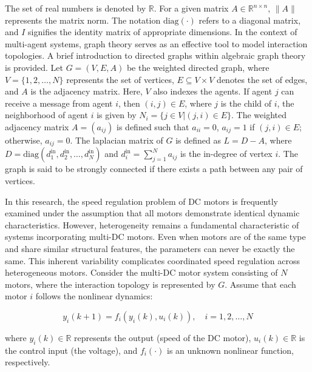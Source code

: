 \documentclass[journal,onecolumn]{IEEEtran}
\begin{document}
The set of real numbers is denoted by $\mathbb{R}$. For a given matrix $A \in \mathbb{R}^{n \times n}$, $\|A\|$ represents the matrix norm. The notation $\text{diag}(\cdot)$ refers to a diagonal matrix, and $I$ signifies the identity matrix of appropriate dimensions. In the context of multi-agent systems, graph theory serves as an effective tool to model interaction topologies. A brief introduction to directed graphs within algebraic graph theory is provided. Let $G = (V, E, A)$ be the weighted directed graph, where $V = \{1, 2, \dots, N\}$ represents the set of vertices, $E \subseteq V \times V$ denotes the set of edges, and $A$ is the adjacency matrix. Here, $V$ also indexes the agents. If agent $j$ can receive a message from agent $i$, then $(i,j) \in E$, where $j$ is the child of $i$, the neighborhood of agent $i$ is given by $N_i = \{j \in V | (j,i) \in E \}$. The weighted adjacency matrix $A = (a_{ij})$ is defined such that $a_{ii} = 0$, $a_{ij} = 1$ if $(j,i) \in E$; otherwise, $a_{ij} = 0$. The laplacian matrix of $G$ is defined as $L = D - A$, where $D = \text{diag}(d_1^{\text{in}}, d_2^{\text{in}}, \dots, d_N^{\text{in}})$ and $d_i^{\text{in}} = \sum_{j=1}^{N} a_{i j}$ is the in-degree of vertex $i$. The graph is said to be strongly connected if there exists a path between any pair of vertices.


In this research, the speed regulation problem of DC motors is frequently examined under the assumption that all motors demonstrate identical dynamic characteristics. However, heterogeneity remains a fundamental characteristic of systems incorporating multi-DC motors. Even when motors are of the same type and share similar structural features, the parameters can never be exactly the same. This inherent variability complicates coordinated speed regulation across heterogeneous motors. Consider the multi-DC motor system consisting of $N$ motors, where the interaction topology is represented by $G$. Assume that each motor $i$ follows the nonlinear dynamics:

\begin{equation}
    \label{model 1}
    y_i(k+1) = f_i(y_i(k), u_i(k)), \quad i = 1, 2, \dots, N
\end{equation}

where $y_i(k) \in \mathbb{R}$ represents the output (speed of the DC motor), $u_i(k) \in \mathbb{R}$ is the control input (the voltage), and $f_i(\cdot)$ is an unknown nonlinear function, respectively.
\end{document}
